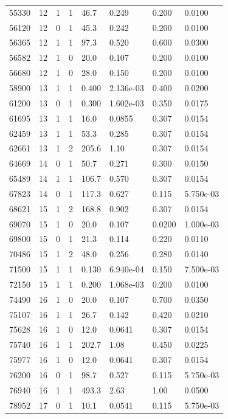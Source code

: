 \documentclass[preview]{standalone}
\begin{document}
{{{\begin{tabular}{L{1.2cm}C{1.2cm} C{0.3cm}C{0.5cm} C{1.4cm}C{1.4cm} C{1.4cm}C{1.4cm}}
  55330  &    12  & 1     &  1 &  46.7  & 0.249  & 0.200 &  0.0100   \\ 
  56120  &    12  & 0     &  1 &  45.3  & 0.242  & 0.200 &  0.0100   \\ 
  56365  &    12  & 1     &  1 &  97.3  & 0.520  & 0.600 &  0.0300   \\ 
  56582  &    12  & 1     &  0 &  20.0  & 0.107  & 0.200 &  0.0100   \\ 
  56680  &    12  & 1     &  0 &  28.0  & 0.150  & 0.200 &  0.0100   \\ 
  58900  &    13  & 1     &  1 &  0.400  & 2.136e-03  & 0.400 &  0.0200   \\ 
  61200  &    13  & 0     &  1 &  0.300  & 1.602e-03  & 0.350 &  0.0175   \\ 
  61695  &    13  & 1     &  1 &  16.0  & 0.0855  & 0.307 &  0.0154   \\ 
  62459  &    13  & 1     &  1 &  53.3  & 0.285  & 0.307 &  0.0154   \\ 
  62661  &    13  & 1     &  2 &  205.6  & 1.10  & 0.307 &  0.0154   \\ 
  64669  &    14  & 0     &  1 &  50.7  & 0.271  & 0.300 &  0.0150   \\ 
  65489  &    14  & 1     &  1 &  106.7  & 0.570  & 0.307 &  0.0154   \\ 
  67823  &    14  & 0     &  1 &  117.3  & 0.627  & 0.115 &  5.750e-03   \\ 
  68621  &    15  & 1     &  2 &  168.8  & 0.902  & 0.307 &  0.0154   \\ 
  69070  &    15  & 1     &  0 &  20.0  & 0.107  & 0.0200 &  1.000e-03   \\ 
  69800  &    15  & 0     &  1 &  21.3  & 0.114  & 0.220 &  0.0110   \\ 
  70486  &    15  & 1     &  2 &  48.0  & 0.256  & 0.280 &  0.0140   \\ 
  71500  &    15  & 1     &  1 &  0.130  & 6.940e-04  & 0.150 &  7.500e-03   \\ 
  72150  &    15  & 1     &  1 &  0.200  & 1.068e-03  & 0.200 &  0.0100   \\ 
  74490  &    16  & 1     &  0 &  20.0  & 0.107  & 0.700 &  0.0350   \\ 
  75107  &    16  & 1     &  1 &  26.7  & 0.142  & 0.420 &  0.0210   \\ 
  75628  &    16  & 1     &  0 &  12.0  & 0.0641  & 0.307 &  0.0154   \\ 
  75740  &    16  & 1     &  1 &  202.7  & 1.08  & 0.450 &  0.0225   \\ 
  75977  &    16  & 1     &  0 &  12.0  & 0.0641  & 0.307 &  0.0154   \\ 
  76200  &    16  & 0     &  1 &  98.7  & 0.527  & 0.115 &  5.750e-03   \\ 
  76940  &    16  & 1     &  1 &  493.3  & 2.63  & 1.00 &  0.0500   \\ 
  78952  &    17  & 0     &  1 &  10.1  & 0.0541  & 0.115 &  5.750e-03   \\ 
\hline 
\end{tabular} 

}}}
\end{document}
